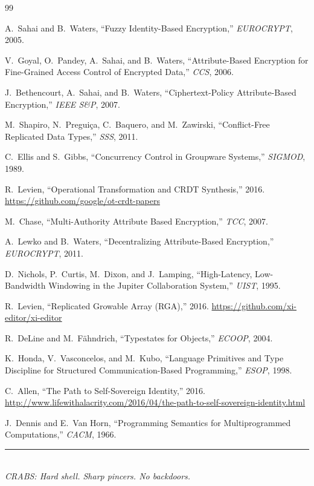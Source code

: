 \documentclass[11pt,a4paper]{article}
\newcommand{\crab}{\textsc{CRABS}}
\begin{document}
\begin{thebibliography}{99}

A.~Sahai and B.~Waters, ``Fuzzy Identity-Based Encryption,'' \textit{EUROCRYPT}, 2005.

V.~Goyal, O.~Pandey, A.~Sahai, and B.~Waters, ``Attribute-Based Encryption for Fine-Grained Access Control of Encrypted Data,'' \textit{CCS}, 2006.

J.~Bethencourt, A.~Sahai, and B.~Waters, ``Ciphertext-Policy Attribute-Based Encryption,'' \textit{IEEE S\&P}, 2007.

M.~Shapiro, N.~Pregui\c{c}a, C.~Baquero, and M.~Zawirski, ``Conflict-Free Replicated Data Types,'' \textit{SSS}, 2011.

C.~Ellis and S.~Gibbs, ``Concurrency Control in Groupware Systems,'' \textit{SIGMOD}, 1989.

R.~Levien, ``Operational Transformation and CRDT Synthesis,'' 2016. \url{https://github.com/google/ot-crdt-papers}

M.~Chase, ``Multi-Authority Attribute Based Encryption,'' \textit{TCC}, 2007.

A.~Lewko and B.~Waters, ``Decentralizing Attribute-Based Encryption,'' \textit{EUROCRYPT}, 2011.

D.~Nichols, P.~Curtis, M.~Dixon, and J.~Lamping, ``High-Latency, Low-Bandwidth Windowing in the Jupiter Collaboration System,'' \textit{UIST}, 1995.

R.~Levien, ``Replicated Growable Array (RGA),'' 2016. \url{https://github.com/xi-editor/xi-editor}

R.~DeLine and M.~F\"{a}hndrich, ``Typestates for Objects,'' \textit{ECOOP}, 2004.

K.~Honda, V.~Vasconcelos, and M.~Kubo, ``Language Primitives and Type Discipline for Structured Communication-Based Programming,'' \textit{ESOP}, 1998.

C.~Allen, ``The Path to Self-Sovereign Identity,'' 2016. \url{http://www.lifewithalacrity.com/2016/04/the-path-to-self-sovereign-identity.html}

J.~Dennis and E.~Van Horn, ``Programming Semantics for Multiprogrammed Computations,'' \textit{CACM}, 1966.

\end{thebibliography}

\vspace{12pt}
\begin{center}
\rule{0.3\textwidth}{0.4pt}\\[4pt]
\textit{\crab{}: Hard shell. Sharp pincers. No backdoors.}
\end{center}
\end{document}
